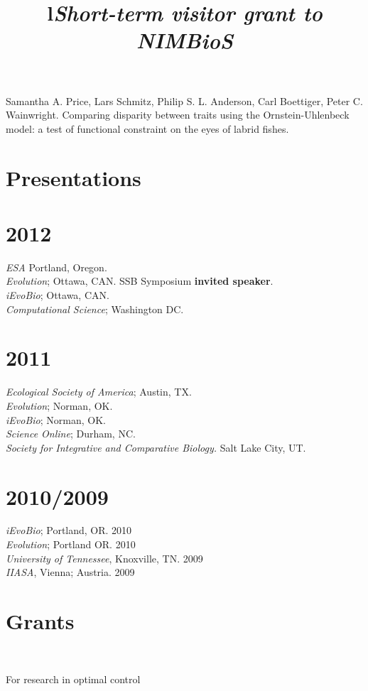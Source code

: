 \documentclass[margin]{res}
\begin{document}
\begin{resume}
Samantha A. Price, Lars Schmitz, Philip S. L. Anderson, Carl Boettiger, Peter C. Wainwright. Comparing disparity between traits using the Ornstein-Uhlenbeck model: a test of functional constraint on the eyes of labrid fishes.

\section{Presentations} 

\section{\textnormal{2012}}
  \emph{ESA} Portland, Oregon. \\ 
  \emph{Evolution}; Ottawa, CAN. SSB Symposium \textbf{invited speaker}.\\
  \emph{iEvoBio}; Ottawa, CAN. \\
  \emph{Computational Science}; Washington DC. 
\section{\textnormal{2011}}
  \emph{Ecological Society of America}; Austin, TX. \\
  \emph{Evolution}; Norman, OK. \\
  \emph{iEvoBio}; Norman, OK. \\
  \emph{Science Online}; Durham, NC.\\
  \emph{Society for Integrative and Comparative Biology.} Salt Lake City, UT. \\
 \section{\textnormal{2010/2009}}
  \emph{iEvoBio}; Portland, OR. 2010 \\
  \emph{Evolution}; Portland OR. 2010 \\
 \emph{University of Tennessee}, Knoxville, TN. 2009 \\
 \emph{IIASA}, Vienna; Austria. 2009

\section{Grants}
\begin{format}
\title{l} \\
\body
\end{format}

\title{\emph{Short-term visitor grant to NIMBioS}}
\begin{position}
  For research in optimal control
  \vspace{-.25cm}
\end{position}


\end{resume}
\end{document}
